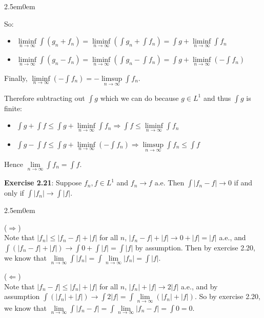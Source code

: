 \documentclass{book}
\newcommand{\exTwoP}{%
   \color{RedViolet}%
   \fontsize{13}{15}\selectfont%
}
\newenvironment{myIndent}{%
   \begin{adjustwidth}{2.5em}{0em}%
}{%
   \end{adjustwidth}%
}
\newcommand{\blab}[1]{\textbf{#1}}
\newcommand{\retTwo}{\hfill\bigbreak}
\begin{document}
\begin{myIndent}
	So: 
	\begin{itemize}
		\item $\liminf\limits_{n \rightarrow \infty}\int (g_n + f_n) = \liminf\limits_{n \rightarrow \infty}(\int g_n + \int f_n) = \int g + \liminf\limits_{n \rightarrow \infty} \int f_n$
		\item $\liminf\limits_{n \rightarrow \infty}\int (g_n - f_n) = \liminf\limits_{n \rightarrow \infty}(\int g_n - \int f_n) = \int g + \liminf\limits_{n \rightarrow \infty} (-\int f_n)$\retTwo
	\end{itemize}

	Finally, $\liminf\limits_{n \rightarrow \infty}(-\int f_n) = -\limsup\limits_{n\rightarrow \infty}\int f_n$.\retTwo
	
	Therefore subtracting out $\int g$ which we can do because $g \in L^1$ and thus $\int g$ is finite:

	\begin{itemize}
		\item $\int g + \int f \leq \int g + \liminf\limits_{n \rightarrow \infty} \int f_n \Longrightarrow \int f \leq\liminf\limits_{n \rightarrow \infty} \int f_n $
		\item $\int g - \int f \leq \int g + \liminf\limits_{n \rightarrow \infty} (-\int f_n) \Longrightarrow \limsup\limits_{n\rightarrow\infty}\int f_n \leq \int f$\retTwo
	\end{itemize}

	Hence $\lim\limits_{n \rightarrow \infty} \int f_n = \int f$.\newpage
\end{myIndent}

\blab{Exercise 2.21}: Suppose $f_n, f \in L^1$ and $f_n \rightarrow f$ a.e. Then $\int |f_n - f| \rightarrow 0$ if and only if $\int |f_n| \rightarrow \int |f|$.

\begin{myIndent}\exTwoP
	($\Longrightarrow$)\\
	Note that $|f_n| \leq |f_n - f| + |f|$ for all $n$, $|f_n - f| + |f| \rightarrow 0 + |f| = |f|$ a.e., and $\int (|f_n - f| + |f|) \rightarrow \int 0 + \int |f| = \int |f|$ by assumption. Then by exercise 2.20, we know that $\lim\limits_{n \rightarrow \infty}\int |f_n| = \int \lim\limits_{n \rightarrow \infty} |f_n| = \int |f|$.\retTwo
	
	($\Longleftarrow$)\\
	Note that $|f_n - f| \leq |f_n| + |f|$ for all $n$, $|f_n| + |f| \rightarrow 2|f|$ a.e., and by\\ [3pt] assumption $\int (|f_n| + |f|) \rightarrow \int 2|f| = \int \lim\limits_{n \rightarrow \infty}(|f_n| + |f|)$. So by exercise 2.20,\\ we know that $\lim\limits_{n\rightarrow \infty}\int |f_n - f| = \int \lim\limits_{n\rightarrow\infty}|f_n - f| = \int 0 = 0$.\retTwo
\end{myIndent}
\end{document}
